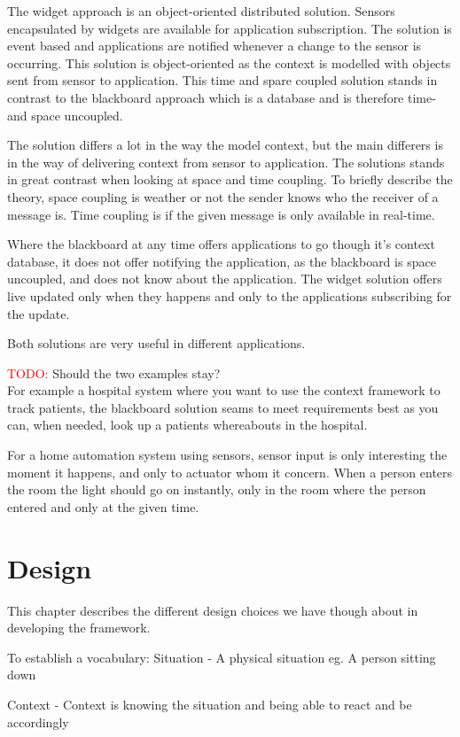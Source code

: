 \documentclass[]{report}
\newcommand\todo[1]{\textcolor{red}{TODO: }#1\PackageWarning{TODO:}{TODO tag!!}}
\begin{document}
The widget approach is an object-oriented distributed solution. Sensors encapsulated by widgets are available for application subscription. The solution is event based and applications are notified whenever a change to the sensor is occurring. This solution is object-oriented as the context is modelled with objects sent from sensor to application. This time and spare coupled solution stands in contrast to the blackboard approach which is a database and is therefore time- and space uncoupled.

The solution differs a lot in the way the model context, but the main differers is in the way of delivering context from sensor to application. The solutions stands in great contrast when looking at space and time coupling. To briefly describe the theory, space coupling is weather or not the sender knows who the receiver of a message is. Time coupling is if the given message is only available in real-time. 

Where the blackboard at any time offers applications to go though it's context database, it does not offer notifying the application, as the blackboard is space uncoupled, and does not know about the application. The widget solution offers live updated only when they happens and only to the applications subscribing for the update.

Both solutions are very useful in different applications.

\todo Should the two examples stay?\\
For example a hospital system where you want to use the context framework to track patients, the blackboard solution seams to meet requirements best as you can, when needed, look up a patients whereabouts in the hospital.

For a home automation system using sensors, sensor input is only interesting the moment it happens, and only to actuator whom it concern. When a person enters the room the light should go on instantly, only in the room where the person entered and only at the given time. 


\chapter{Design}
This chapter describes the different design choices we have though about in developing the framework.

To establish a vocabulary:
	Situation - A physical situation eg. A person sitting down

	Context - Context is knowing the situation and being able to react and be accordingly
\end{document}
